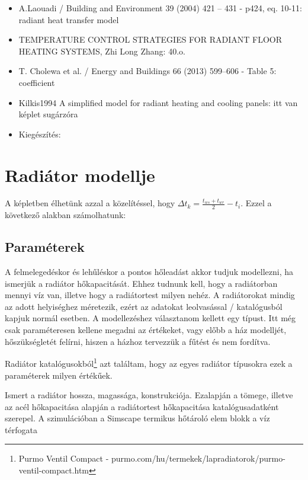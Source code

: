 \begin{itemize}[itemsep=0pt,topsep=0pt,parsep=0pt,partopsep=0pt]
	\item A.Laouadi / Building and Environment 39 (2004) 421 – 431 - p424, eq. 10-11: radiant heat transfer model
	\item TEMPERATURE CONTROL STRATEGIES FOR RADIANT FLOOR HEATING SYSTEMS, Zhi Long Zhang: 40.o.  
	\item \cite{CHOLEWA2013599} T. Cholewa et al. / Energy and Buildings 66 (2013) 599–606 - Table 5: coefficient
	\item Kilkis1994 A simplified model for radiant heating and cooling panels: itt van képlet sugárzóra
	\item Kiegészítés: \cite[349.~o.]{Herz}
\end{itemize}  

\section{Radiátor modellje}

A képletben élhetünk azzal a közelítéssel, hogy $\Delta t_k=\frac{t_{ws}+t_{wr}}{2}-t_i$. Ezzel a következő alakban számolhatunk:

\subsection{Paraméterek}
A felmelegedéskor és lehűléskor a pontos hőleadást akkor tudjuk modellezni, ha ismerjük a radiátor hőkapacitását. Ehhez tudnunk kell, hogy a radiátorban mennyi víz van, illetve hogy a radiátortest milyen nehéz.
A radiátorokat mindig az adott helyiséghez méretezik, ezért az adatokat leolvasással / katalógusból kapjuk normál esetben. A modellezéshez választanom kellett egy típust. Itt még csak paraméteresen kellene megadni az értékeket, vagy előbb a ház modelljét, hőszükségletét felírni, hiszen a házhoz tervezzük a fűtést és nem fordítva.

Radiátor katalógusokból\footnote{Purmo Ventil Compact - purmo.com/hu/termekek/lapradiatorok/purmo-ventil-compact.htm} azt találtam, hogy az egyes radiátor típusokra ezek a paraméterek milyen értékűek.




Ismert a radiátor hossza, magassága, konstrukciója. Ezalapján a
tömege, illetve az acél hőkapacitása alapján a radiátortest hőkapacitása katalógusadatként szerepel.
A szimulációban a  Simscape termikus hőtároló elem blokk a víz térfogata%

